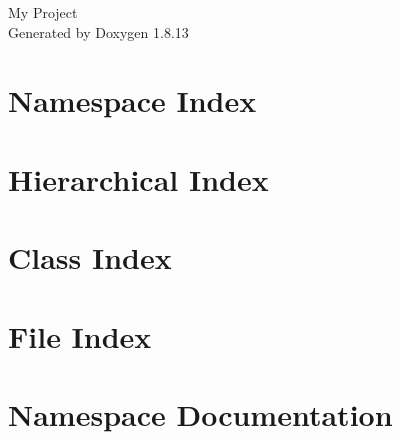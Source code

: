 \documentclass[twoside]{book}
\newcommand{\+}{\discretionary{\mbox{\scriptsize$\hookleftarrow$}}{}{}}
\newcommand{\clearemptydoublepage}{%
  \newpage{\pagestyle{empty}\cleardoublepage}%
}
\begin{document}
\hypersetup{pageanchor=false,
             bookmarksnumbered=true,
             pdfencoding=unicode
            }
\begin{titlepage}
\vspace*{7cm}
\begin{center}%
{\Large My Project }\\
\vspace*{1cm}
{\large Generated by Doxygen 1.8.13}\\
\end{center}
\end{titlepage}
\clearemptydoublepage
{}
\tableofcontents
\clearemptydoublepage
{}
\hypersetup{pageanchor=true}

\chapter{Namespace Index}

\chapter{Hierarchical Index}

\chapter{Class Index}

\chapter{File Index}

\chapter{Namespace Documentation}












\end{document}

